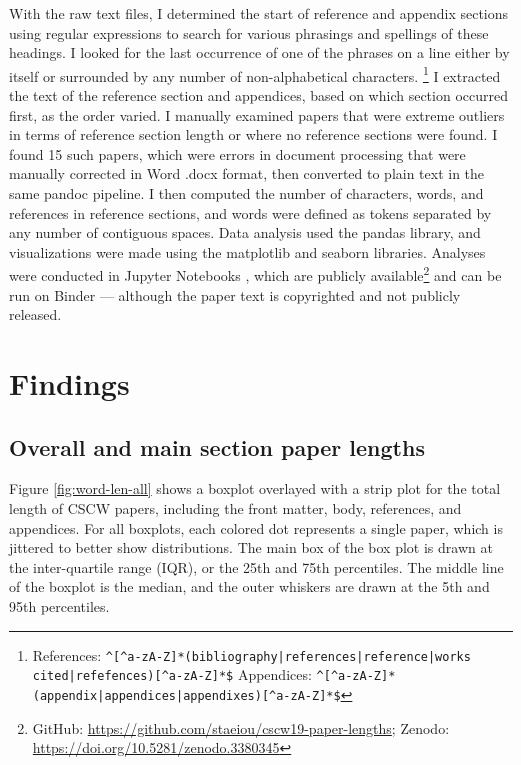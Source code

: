 \documentclass[format=acmsmall, screen=true]{acmart}
\begin{document}
With the raw text files, I determined the start of reference and appendix sections using regular expressions to search for various phrasings and spellings of these headings. I looked for the last occurrence of one of the phrases on a line either by itself or surrounded by any number of non-alphabetical characters. \footnote{References: \texttt{\textasciicircum{}[\textasciicircum{}a-zA-Z]*(bibliography|references|reference|works cited|refefences)[\textasciicircum{}a-zA-Z]*\$} \newline
Appendices: \texttt{\textasciicircum{}[\textasciicircum{}a-zA-Z]*(appendix|appendices|appendixes)[\textasciicircum{}a-zA-Z]*\$} } I extracted the text of the reference section and appendices, based on which section occurred first, as the order varied. I manually examined papers that were extreme outliers in terms of reference section length or where no reference sections were found. I found 15 such papers, which were errors in document processing that were manually corrected in Word .docx format, then converted to plain text in the same pandoc pipeline. I then computed the number of characters, words, and references in reference sections, and words were defined as tokens separated by any number of contiguous spaces. Data analysis used the pandas \cite{pandas} library, and visualizations were made using the matplotlib \cite{matplotlib} and seaborn \cite{seaborn} libraries. Analyses were conducted in Jupyter Notebooks \cite{jupyter}, which are publicly available\footnote{GitHub: \url{https://github.com/staeiou/cscw19-paper-lengths}; Zenodo: \url{https://doi.org/10.5281/zenodo.3380345}} and can be run on Binder \cite{binder} --- although the paper text is copyrighted and not publicly released.

\section{Findings}

\subsection{Overall and main section paper lengths}

Figure \ref{fig:word-len-all} shows a boxplot overlayed with a strip plot for the total length of CSCW papers, including the front matter, body, references, and appendices. For all boxplots, each colored dot represents a single paper, which is jittered to better show distributions. The main box of the box plot is drawn at the inter-quartile range (IQR), or the 25th and 75th percentiles. The middle line of the boxplot is the median, and the outer whiskers are drawn at the 5th and 95th percentiles. 
\end{document}
